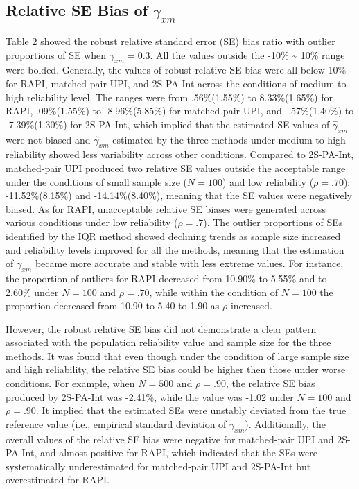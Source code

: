\documentclass[
  man]{apa6}
\newenvironment{lltable}{\begin{landscape}\centering\begin{ThreePartTable}}{\end{ThreePartTable}\end{landscape}}
\begin{document}
\begin{lltable}
{}

\end{lltable}

\hypertarget{relative-se-bias-of-gamma_xm}{%
\subsection{\texorpdfstring{Relative SE Bias of \(\gamma_{xm}\)}{Relative SE Bias of \textbackslash gamma\_\{xm\}}}\label{relative-se-bias-of-gamma_xm}}

Table 2 showed the robust relative standard error (SE) bias ratio with outlier proportions of SE when \(\gamma_{xm} = 0.3\). All the values outside the -10\% \textasciitilde{} 10\% range were bolded. Generally, the values of robust relative SE bias were all below 10\% for RAPI, matched-pair UPI, and 2S-PA-Int across the conditions of medium to high reliability level. The ranges were from .56\%(1.55\%) to 8.33\%(1.65\%) for RAPI, .09\%(1.55\%) to -8.96\%(5.85\%) for matched-pair UPI, and -.57\%(1.40\%) to -7.39\%(1.30\%) for 2S-PA-Int, which implied that the estimated SE values of \(\hat{\gamma}_{xm}\) were not biased and \(\hat{\gamma}_{xm}\) estimated by the three methods under medium to high reliability showed less variability across other conditions. Compared to 2S-PA-Int, matched-pair UPI produced two relative SE values outside the acceptable range under the conditions of small sample size (\(\textit{N} = 100\)) and low reliability (\(\rho = .70\)): -11.52\%(8.15\%) and -14.14\%(8.40\%), meaning that the SE values were negatively biased. As for RAPI, unacceptable relative SE biases were generated across various conditions under low reliability (\(\rho = .7\)). The outlier proportions of SEs identified by the IQR method showed declining trends as sample size increased and reliability levels improved for all the methods, meaning that the estimation of \(\gamma_{xm}\) became more accurate and stable with less extreme values. For instance, the proportion of outliers for RAPI decreased from 10.90\% to 5.55\% and to 2.60\% under \(\textit{N} = 100\) and \(\rho = .70\), while within the condition of \(\textit{N} = 100\) the proportion decreased from 10.90 to 5.40 to 1.90 as \(\rho\) increased.

However, the robust relative SE bias did not demonstrate a clear pattern associated with the population reliability value and sample size for the three methods. It was found that even though under the condition of large sample size and high reliability, the relative SE bias could be higher then those under worse conditions. For example, when \(\textit{N} = 500\) and \(\rho = .90\), the relative SE bias produced by 2S-PA-Int was -2.41\%, while the value was -1.02 under \(\textit{N} = 100\) and \(\rho = .90\). It implied that the estimated SEs were unstably deviated from the true reference value (i.e., empirical standard deviation of \(\gamma_{xm}\)). Additionally, the overall values of the relative SE bias were negative for matched-pair UPI and 2S-PA-Int, and almost positive for RAPI, which indicated that the SEs were systematically underestimated for matched-pair UPI and 2S-PA-Int but overestimated for RAPI.
\end{document}
